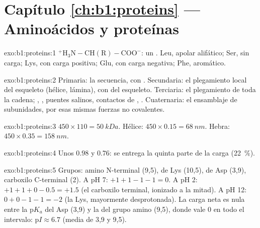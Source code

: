 \section*{Capítulo \ref{ch:b1:proteins} --- Aminoácidos y proteínas}

\begin{solution}{exo:b1:proteins:1}
$\mathrm{^+H_3N{-}CH(R){-}COO^-}$: un . Leu, apolar alifático;
Ser,  sin carga; Lys, con carga positiva; Glu, con carga negativa; Phe,
aromático.
\end{solution}

\begin{solution}{exo:b1:proteins:2}
Primaria: la secuencia, con . Secundaria: el plegamiento
local del esqueleto (hélice, lámina), con  del
esqueleto. Terciaria: el plegamiento de toda la cadena; ,
, puentes salinos, contactos de , . Cuaternaria: el ensamblaje de subunidades, por esas mismas
fuerzas no covalentes.
\end{solution}

\begin{solution}{exo:b1:proteins:3}
$450\times 110 = \qty{50}{kDa}$. Hélice: $450\times 0.15 = \qty{68}{nm}$.
Hebra: $450\times 0.35 = \qty{158}{nm}$.
\end{solution}

\begin{solution}{exo:b1:proteins:4}
Unos $0.98$ y $0.76$: se entrega la quinta parte de la carga
(\qty{22}{\%}).
\end{solution}

\begin{solution}{exo:b1:proteins:5}
Grupos: amino N-terminal (9,5),  de Lys (10,5), 
de Asp (3,9), carboxilo C-terminal (2). A pH 7: $+1 + 1 - 1 - 1 = 0$. A
pH 2: $+1 + 1 + 0 - 0.5 = +1.5$ (el carboxilo terminal, ionizado a la
mitad). A pH 12: $0 + 0 - 1 - 1 = -2$ (la Lys, mayormente desprotonada). La
carga neta es nula entre la p$K_a$ del Asp (3,9) y la del grupo amino (9,5),
donde vale $0$ en todo el intervalo: p$I \approx 6.7$ (media de 3,9 y 9,5).
\end{solution}

